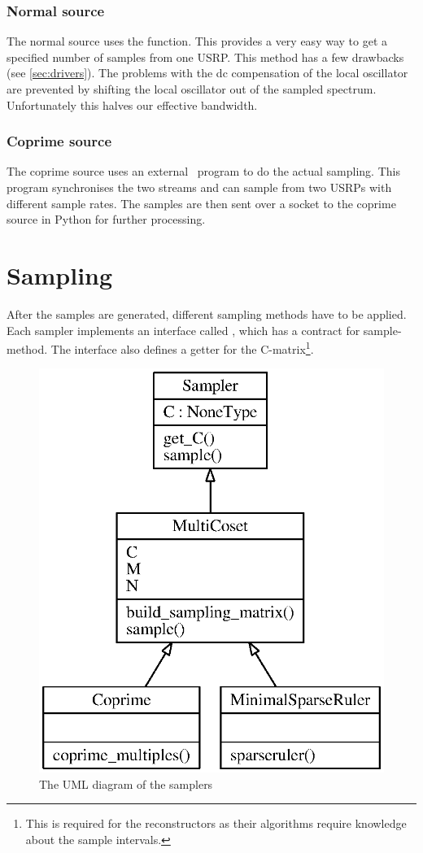 \documentclass[a4paper, openany, oneside]{memoir}
\begin{document}
\subsubsection{Normal source}
The normal source uses the  function. This provides a very easy way to get a specified number of samples from one USRP\@. This method has a few drawbacks (see \cref{sec:drivers}). The problems with the dc compensation of the local oscillator are prevented by shifting the local oscillator out of the sampled spectrum. Unfortunately this halves our effective bandwidth.

\subsubsection{Coprime source}
The coprime source uses an external \CC~program to do the actual sampling. This program synchronises the two streams and can sample from two USRPs with different sample rates. The samples are then sent over a socket to the coprime source in Python for further processing.


\section{Sampling}
\label{sec:sampling}
After the samples are generated, different sampling methods have to be applied. Each sampler implements an interface called , which has a contract for sample-method. The interface also defines a getter for the C-matrix\footnote{This is required for the reconstructors as their algorithms require knowledge about the sample intervals.}.

\begin{figure}
    \centering
    \includegraphics[width=0.5\linewidth]{./figures/classes_sampling.eps}
    \caption{The UML diagram of the samplers}
    \label{fig:umlclasses}
\end{figure}
\end{document}
